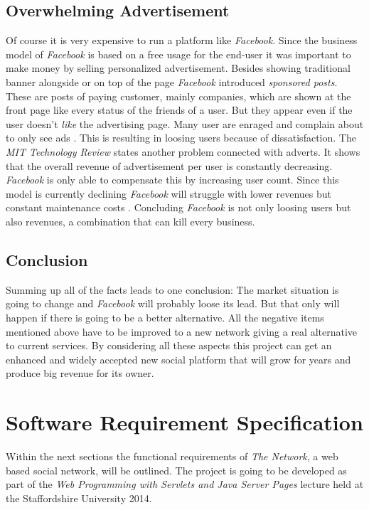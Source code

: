 \documentclass[11pt,a4paper]{report}
\begin{document}
\section{Overwhelming Advertisement}
Of course it is very expensive to run a platform like \emph{Facebook}. Since the business model of \emph{Facebook} is  based on a free usage for the end-user it was important to make money by selling personalized advertisement. Besides showing traditional banner alongside or on top of the page \emph{Facebook} introduced \emph{sponsored posts}. These are posts of paying customer, mainly companies, which are shown at the front page like every status of the friends of a user. But they appear even if the user doesn't \emph{like} the advertising page. Many user are enraged and complain about to only see ads \cite{Sloane:2013aa}. This is resulting in loosing users because of dissatisfaction. The \emph{MIT Technology Review} states another problem connected with adverts. It shows that the overall revenue of advertisement per user is constantly decreasing. \emph{Facebook} is only able to compensate this by increasing user count. Since this model is currently declining \emph{Facebook} will struggle with lower revenues but constant maintenance costs \cite{Wolff:2012aa}. Concluding \emph{Facebook} is not only loosing users but also revenues, a combination that can kill every business.

\section{Conclusion}
Summing up all of the facts leads to one conclusion: The market situation is going to change and \emph{Facebook} will probably loose its lead. But that only will happen if there is going to be a better alternative. All the negative items mentioned above have to be improved to a new network giving a real alternative to current services. By considering all these aspects this project can get an enhanced and widely accepted new social platform that will grow for years and produce big revenue for its owner.

\chapter{Software Requirement Specification}
Within the next sections the functional requirements of \emph{The Network}, a web based social network, will be outlined. The project is going to be developed as part of the \emph{Web Programming with Servlets and Java Server Pages} lecture held at the Staffordshire University 2014.
\end{document}
